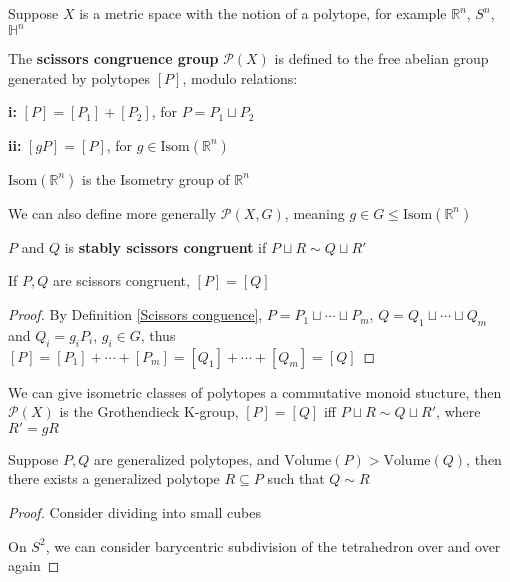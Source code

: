 \documentclass[../main.tex]{subfiles}
\begin{document}
\begin{definition}
Suppose $X$ is a metric space with the notion of a polytope, for example $\mathbb R^n$, $S^n$, $\mathbb H^n$ \par
The \textbf{scissors congruence group} $\mathcal P(X)$ is defined to the free abelian group generated by polytopes $[P]$, modulo relations: \par
\textbf{i: }$[P]=[P_1]+[P_2]$, for $P=P_1\sqcup P_2$ \par
\textbf{ii: }$[gP]=[P]$, for $g\in \mathrm{Isom}(\mathbb R^n)$ \par
$\mathrm{Isom}(\mathbb R^n)$ is the Isometry group of $\mathbb R^n$ \par
We can also define more generally $\mathcal P(X,G)$, meaning $g\in G\leq \mathrm{Isom}(\mathbb R^n)$ \par
$P$ and $Q$ is \textbf{stably scissors congruent} if $P\sqcup R\sim Q\sqcup R'$
\end{definition}

\begin{proposition}
If $P,Q$ are scissors congruent, $[P]=[Q]$
\end{proposition}

\begin{proof}
By Definition \ref{Scissors conguence}, $P=P_1\sqcup\cdots\sqcup P_m$, $Q=Q_1\sqcup\cdots\sqcup Q_m$ and $Q_i=g_iP_i$, $g_i\in G$, thus $[P]=[P_1]+\cdots+[P_m]=[Q_1]+\cdots+[Q_m]=[Q]$
\end{proof}

\begin{remark}
We can give isometric classes of polytopes a commutative monoid stucture, then $\mathcal P(X)$ is the Grothendieck K-group, $[P]=[Q]$ iff $P\sqcup R\sim Q\sqcup R'$, where $R'=gR$
\end{remark}

\begin{lemma}\label{Lemma for Zylev's theorem}
Suppose $P,Q$ are generalized polytopes, and $\mathrm{Volume}(P)>\mathrm{Volume}(Q)$, then there exists a generalized polytope $R\subseteq P$ such that $Q\sim R$
\end{lemma}

\begin{proof}
Consider dividing into small cubes \par
On $S^2$, we can consider barycentric subdivision of the tetrahedron over and over again
\end{proof}
\end{document}
